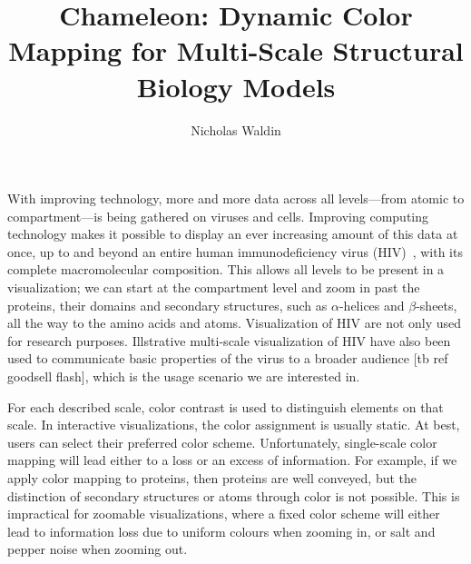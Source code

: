 \documentclass[review,journal]{vgtc}         %
\title{Chameleon: Dynamic Color Mapping	for Multi-Scale Structural Biology Models}
\author{Nicholas Waldin}
\begin{document}
	
	
	\label{introduction}
	\maketitle
	
	With improving technology, more and more data across all levels---from atomic to compartment---is being gathered on viruses and cells. 
	Improving computing technology makes it possible to display an ever increasing amount of this data at once, up to and beyond an entire human immunodeficiency virus (HIV)~\cite{muzic2015cellview}, with its complete macromolecular composition.
	This allows all levels to be present in a visualization; we can start at the compartment level and zoom in past the proteins, their domains and secondary structures, such as $\alpha$-helices and $\beta$-sheets, all the way to the amino acids and atoms. Visualization of HIV are not only used for research purposes. Illstrative multi-scale visualization of HIV have also been used to communicate basic properties of the virus to a broader audience [tb ref goodsell flash], which is the usage scenario we are interested in.
	
	For each described scale, color contrast is used to distinguish elements on that scale. 
	In interactive visualizations, the color assignment is usually static. 
	At best, users can select their preferred color scheme. 
	Unfortunately, single-scale color mapping will lead either to a loss or an excess of information.
	For example, if we apply color mapping to proteins, then proteins are well conveyed, but the distinction of secondary structures or atoms through color is not possible.
	This is impractical for zoomable visualizations, where a fixed color scheme will either lead to information loss due to uniform colours when zooming in, or salt and pepper noise when zooming out.
	
\end{document}
